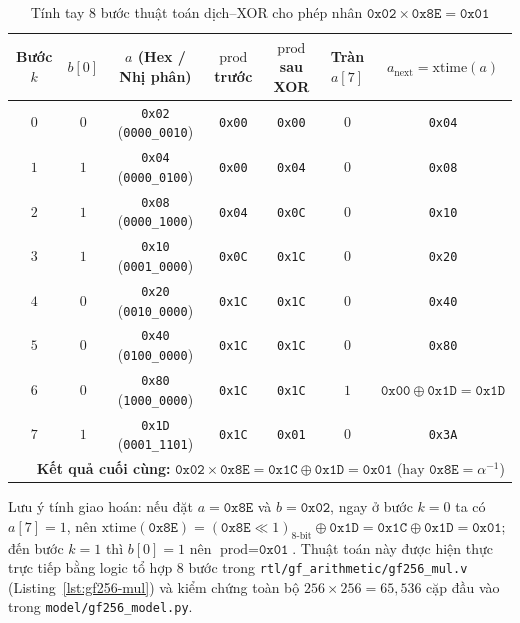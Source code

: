 \documentclass[12pt,a4paper]{report}
\begin{document}
\begin{table}[!htb]
    \centering
    \caption{Tính tay 8 bước thuật toán dịch--XOR cho phép nhân $\texttt{0x02} \times \texttt{0x8E} = \texttt{0x01}$}
    \label{tab:mul-trace-02-8E}
    \small
    \setlength{\tabcolsep}{4pt}
    \begin{tabular}{@{}ccccccc@{}}
        \toprule
        \textbf{Bước $k$} & \textbf{$b[0]$} & \textbf{$a$ (Hex / Nhị phân)} & \textbf{$\text{prod}$ trước} & \textbf{$\text{prod}$ sau XOR} & \textbf{Tràn $a[7]$} & \textbf{$a_{\text{next}} = \text{xtime}(a)$} \\
        \midrule
        $0$ & $0$ & \texttt{0x02} (\texttt{0000\_0010}) & \texttt{0x00} & \texttt{0x00} & $0$ & \texttt{0x04} \\
        $1$ & $1$ & \texttt{0x04} (\texttt{0000\_0100}) & \texttt{0x00} & \texttt{0x04} & $0$ & \texttt{0x08} \\
        $2$ & $1$ & \texttt{0x08} (\texttt{0000\_1000}) & \texttt{0x04} & \texttt{0x0C} & $0$ & \texttt{0x10} \\
        $3$ & $1$ & \texttt{0x10} (\texttt{0001\_0000}) & \texttt{0x0C} & \texttt{0x1C} & $0$ & \texttt{0x20} \\
        $4$ & $0$ & \texttt{0x20} (\texttt{0010\_0000}) & \texttt{0x1C} & \texttt{0x1C} & $0$ & \texttt{0x40} \\
        $5$ & $0$ & \texttt{0x40} (\texttt{0100\_0000}) & \texttt{0x1C} & \texttt{0x1C} & $0$ & \texttt{0x80} \\
        $6$ & $0$ & \texttt{0x80} (\texttt{1000\_0000}) & \texttt{0x1C} & \texttt{0x1C} & $1$ & $\texttt{0x00}\oplus\texttt{0x1D}=\texttt{0x1D}$ \\
        $7$ & $1$ & \texttt{0x1D} (\texttt{0001\_1101}) & \texttt{0x1C} & \texttt{0x01} & $0$ & \texttt{0x3A} \\
        \midrule
        \multicolumn{7}{r}{\textbf{Kết quả cuối cùng:} $\texttt{0x02} \times \texttt{0x8E} = \texttt{0x1C} \oplus \texttt{0x1D} = \texttt{0x01}$ ($\text{hay } \texttt{0x8E} = \alpha^{-1}$)} \\
        \bottomrule
    \end{tabular}
\end{table}

Lưu ý tính giao hoán: nếu đặt $a = \texttt{0x8E}$ và $b = \texttt{0x02}$, ngay ở bước $k=0$ ta có $a[7] = 1$, nên $\text{xtime}(\texttt{0x8E}) = (\texttt{0x8E} \ll 1)_{\text{8-bit}} \oplus \texttt{0x1D} = \texttt{0x1C} \oplus \texttt{0x1D} = \texttt{0x01}$; đến bước $k=1$ thì $b[0]=1$ nên $\text{prod} = \texttt{0x01}$. Thuật toán này được hiện thực trực tiếp bằng logic tổ hợp 8 bước trong \texttt{rtl/gf\_arithmetic/gf256\_mul.v} (Listing~\ref{lst:gf256-mul}) và kiểm chứng toàn bộ $256 \times 256 = 65{,}536$ cặp đầu vào trong \texttt{model/gf256\_model.py}.
\end{document}
